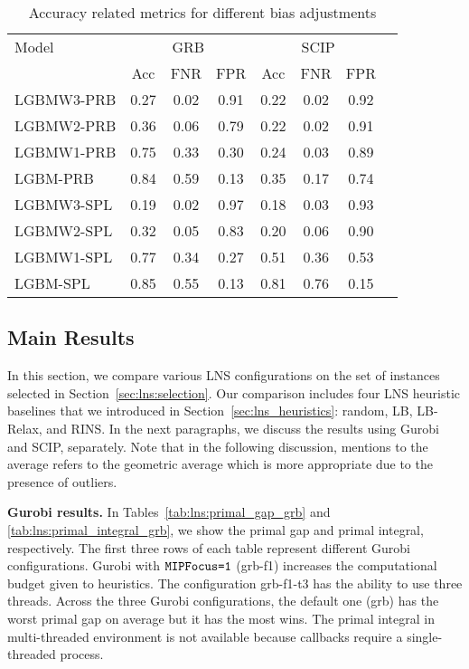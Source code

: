 \documentclass[3p, authoryear, times]{elsarticle}
\begin{document}
\begin{table}[h]
\centering
\caption{Accuracy related metrics for different bias adjustments}
\label{tab:accuracy_metrics}
\begin{tabular}{lccccccc}
\toprule
{Model} & \multicolumn{3}{c}{GRB} & \multicolumn{3}{c}{SCIP} \\
{} & {Acc} & {FNR} & {FPR} & {Acc} & {FNR} & {FPR} \\
\midrule
LGBMW3-PRB & 0.27 & 0.02 & 0.91 & 0.22 & 0.02 & 0.92 \\
LGBMW2-PRB & 0.36 & 0.06 & 0.79 & 0.22 & 0.02 & 0.91 \\
LGBMW1-PRB & 0.75 & 0.33 & 0.30 & 0.24 & 0.03 & 0.89 \\
LGBM-PRB & 0.84 & 0.59 & 0.13 & 0.35 & 0.17 & 0.74 \\
LGBMW3-SPL & 0.19 & 0.02 & 0.97 & 0.18 & 0.03 & 0.93 \\
LGBMW2-SPL & 0.32 & 0.05 & 0.83 & 0.20 & 0.06 & 0.90 \\
LGBMW1-SPL & 0.77 & 0.34 & 0.27 & 0.51 & 0.36 & 0.53 \\
LGBM-SPL & 0.85 & 0.55 & 0.13 & 0.81 & 0.76 & 0.15 \\
\bottomrule
\end{tabular}
\end{table}




\subsection{Main Results}\label{sec:lns:main_results}

In this section, we compare various LNS configurations on the set of instances selected in Section~\ref{sec:lns:selection}.  Our comparison includes four LNS heuristic baselines that we introduced in Section~\ref{sec:lns_heuristics}: random, LB, LB-Relax, and RINS. In the next paragraphs, we discuss the results using Gurobi and SCIP, separately. Note that in the following discussion, mentions to the average refers to the geometric average which is more appropriate due to the presence of outliers. 

\textbf{Gurobi results.} In Tables~\ref{tab:lns:primal_gap_grb} and \ref{tab:lns:primal_integral_grb}, we show the primal gap and primal integral, respectively. The first three rows of each table represent different Gurobi configurations. Gurobi with $\varname{MIPFocus=1}$ (grb-f1) increases the computational budget given to heuristics. The configuration grb-f1-t3 has the ability to use three threads. Across the three Gurobi configurations, the default one (grb) has the worst primal gap on average but it has the most wins. The primal integral in multi-threaded environment is not available because callbacks require a single-threaded process. 
\end{document}
